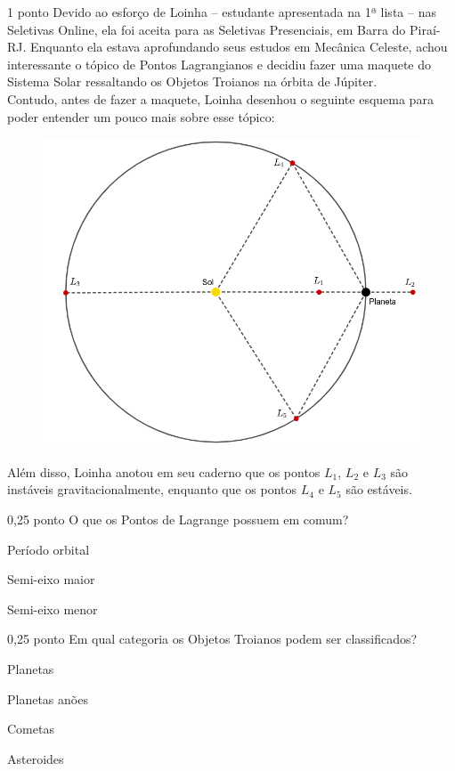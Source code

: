 \documentclass{../lista}
\begin{document}
	\begin{questao}{1 ponto}
		Devido ao esforço de Loinha -- estudante apresentada na 1ª lista -- nas Seletivas Online, ela foi aceita para as Seletivas Presenciais, em Barra do Piraí-RJ. Enquanto ela estava aprofundando seus estudos em Mecânica Celeste, achou interessante o tópico de Pontos Lagrangianos e decidiu fazer uma maquete do Sistema Solar ressaltando os Objetos Troianos na órbita de Júpiter. \\
		Contudo, antes de fazer a maquete, Loinha desenhou o seguinte esquema para poder entender um pouco mais sobre esse tópico:
		\begin{figure}[H]
			\centering
			\includegraphics[scale=0.5]{./img/3.png}
		\end{figure}
		Além disso, Loinha anotou em seu caderno que os pontos $L_1$, $L_2$ e $L_3$ são instáveis gravitacionalmente, enquanto que os pontos $L_4$ e $L_5$ são estáveis.

		\begin{pergunta}{0,25 ponto}
			O que os Pontos de Lagrange possuem em comum?
			\begin{alternativas}
				\item Período orbital
				\item Semi-eixo maior
				\item Semi-eixo menor 
			\end{alternativas}
		\end{pergunta}

		\begin{pergunta}{0,25 ponto}
			Em qual categoria os Objetos Troianos podem ser classificados?
			\begin{alternativas}
				\item Planetas
				\item Planetas anões
				\item Cometas
				\item Asteroides
			\end{alternativas}
		\end{pergunta}


\end{questao}
\end{document}
